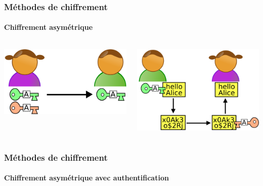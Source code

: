         \begin{frame}
            \frametitle{Méthodes de chiffrement}
            \framesubtitle{Chiffrement asymétrique}
            \begin{columns}
                \begin{column}{.4\linewidth}
                    \includegraphics[width=\linewidth]{rsc/asymetrique_1.png}
                \end{column}

                \begin{column}{.4\linewidth}
                    \includegraphics[width=\linewidth]{rsc/asymetrique_2.png}
                \end{column}
            \end{columns}
        \end{frame}

        \begin{frame}
            \frametitle{Méthodes de chiffrement}
            \framesubtitle{Chiffrement asymétrique avec authentification}
        \end{frame}

